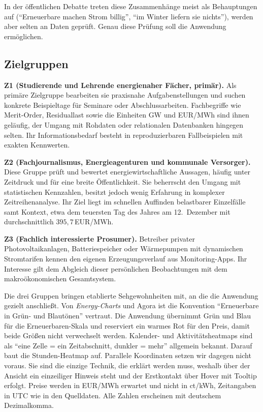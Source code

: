 In der öffentlichen Debatte treten diese Zusammenhänge meist als Behauptungen auf
(\enquote{Erneuerbare machen Strom billig}, \enquote{im Winter liefern sie nichts}), werden aber
selten an Daten geprüft. Genau diese Prüfung soll die Anwendung ermöglichen.

\subsection{Zielgruppen}

\textbf{Z1 (Studierende und Lehrende energienaher Fächer, primär).} Als primäre Zielgruppe bearbeiten
sie praxisnahe Aufgabenstellungen und suchen konkrete Beispieltage für Seminare oder Abschlussarbeiten.
Fachbegriffe wie Merit-Order, Residuallast sowie die Einheiten GW und EUR/MWh sind ihnen geläufig,
der Umgang mit Rohdaten oder relationalen Datenbanken hingegen selten. Ihr Informationsbedarf besteht in
reproduzierbaren Fallbeispielen mit exakten Kennwerten.

\textbf{Z2 (Fachjournalismus, Energieagenturen und kommunale Versorger).} Diese Gruppe prüft und bewertet
energiewirtschaftliche Aussagen, häufig unter Zeitdruck und für eine breite Öffentlichkeit. Sie beherrscht
den Umgang mit statistischen Kennzahlen, besitzt jedoch wenig Erfahrung in komplexer Zeitreihenanalyse.
Ihr Ziel liegt im schnellen Auffinden belastbarer Einzelfälle samt Kontext, etwa dem teuersten Tag des
Jahres am 12.\ Dezember mit durchschnittlich $395{,}7$\,EUR/MWh.

\textbf{Z3 (Fachlich interessierte Prosumer).} Betreiber privater Photovoltaikanlagen, Batteriespeicher
oder Wärmepumpen mit dynamischen Stromtarifen kennen den eigenen Erzeugungsverlauf aus Monitoring-Apps.
Ihr Interesse gilt dem Abgleich dieser persönlichen Beobachtungen mit dem makroökonomischen Gesamtsystem.

Die drei Gruppen bringen etablierte Sehgewohnheiten mit, an die die Anwendung gezielt anschließt. Von
\emph{Energy-Charts} \cite{EnergyCharts} und Agora ist die Konvention \enquote{Erneuerbare in Grün- und Blautönen}
vertraut. Die Anwendung übernimmt Grün und Blau für die Erneuerbaren-Skala und reserviert ein warmes Rot für
den Preis, damit beide Größen nicht verwechselt werden. Kalender- und Aktivitätsheatmaps sind als
\enquote{eine Zelle = ein Zeitabschnitt, dunkler = mehr} allgemein bekannt. Darauf baut die Stunden-Heatmap auf.
Parallele Koordinaten setzen wir dagegen nicht voraus. Sie sind die einzige Technik, die erklärt werden muss,
weshalb über der Ansicht ein einzeiliger Hinweis steht und der Erstkontakt über Hover mit Tooltip erfolgt.
Preise werden in EUR/MWh erwartet und nicht in ct/kWh, Zeitangaben in UTC wie in den Quelldaten. Alle Zahlen
erscheinen mit deutschem Dezimalkomma.

